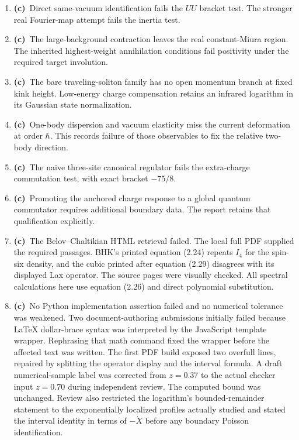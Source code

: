 \documentclass[11pt,a4paper]{article}
\newcommand{\C}{\textbf{(c)}\ }
\begin{document}
\begin{enumerate}
\item \C Direct same-vacuum identification fails the $UU$ bracket test.
The stronger real Fourier-map attempt fails the inertia test.
\item \C The large-background contraction leaves the real constant-Miura
region. The inherited highest-weight annihilation conditions fail positivity
under the required target involution.
\item \C The bare traveling-soliton family has no open momentum branch at
fixed kink height. Low-energy charge compensation retains an infrared
logarithm in its Gaussian state normalization.
\item \C One-body dispersion and vacuum elasticity miss the current
deformation at order $\hbar$. This records failure of those observables to
fix the relative two-body direction.
\item \C The naive three-site canonical regulator fails the extra-charge
commutation test, with exact bracket $-75/8$.
\item \C Promoting the anchored charge response to a global quantum
commutator requires additional boundary data. The report retains that
qualification explicitly.
\item \C The Belov--Chaltikian HTML retrieval failed. The local full PDF
supplied the required passages. BHK's printed equation (2.24) repeats
$I_4$ for the spin-six density, and the cubic printed after equation (2.29)
disagrees with its displayed Lax operator. The source pages were visually
checked. All spectral calculations here use equation (2.26) and direct
polynomial substitution.
\item \C No Python implementation assertion failed and no numerical
tolerance was weakened. Two document-authoring submissions initially
failed because LaTeX dollar-brace syntax was interpreted by the JavaScript
template wrapper. Rephrasing that math command fixed the wrapper before
the affected text was written. The first PDF build exposed two overfull
lines, repaired by splitting the operator display and the interval formula.
A draft numerical-sample label was corrected from $z=0.37$ to the actual
checker input $z=0.70$ during independent review. The computed bound was
unchanged. Review also restricted the logarithm's bounded-remainder
statement to the exponentially localized profiles actually studied and
stated the interval identity in terms of $-\dot X$ before any boundary
Poisson identification.
\end{enumerate}
\end{document}
